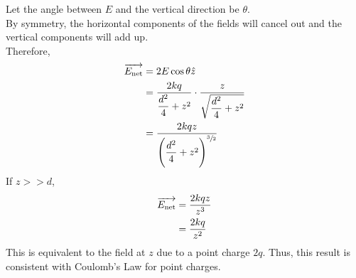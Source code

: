 \documentclass[fleqn, a4paper, 12pt, oneside]{amsart}
\theoremstyle{definition}
\theoremstyle{theorem}
\begin{document}
\begin{solution}
	\begin{tasks}
		\task
			\begin{figure}[H]
			\end{figure}
			Let the angle between $E$ and the vertical direction be $\theta$.\\
			By symmetry, the horizontal components of the fields will cancel out and the vertical components will add up.\\
			Therefore,
			\begin{align*}
				\overrightarrow{E_{\textnormal{net}}} &= 2 E \cos \theta \hat{z}\\
				&= \dfrac{2 k q}{\dfrac{d^2}{4} + z^2} \cdot \dfrac{z}{\sqrt{\dfrac{d^2}{4} + z^2}}\\
				&= \dfrac{2 k q z}{\left( \dfrac{d^2}{4} + z^2 \right)^{\sfrac{3}{2}}}
			\end{align*}
			If $z >> d$,
			\begin{align*}
				\overrightarrow{E_{\textnormal{net}}} &= \dfrac{2 k q z}{z^3}\\
				&= \dfrac{2 k q}{z^2}
			\end{align*}
			This is equivalent to the field at $z$ due to a point charge $2q$. Thus, this result is consistent with Coulomb's Law for point charges.
		\task
			\begin{figure}[H]
\end{figure}
\end{tasks}
\end{solution}
\end{document}
